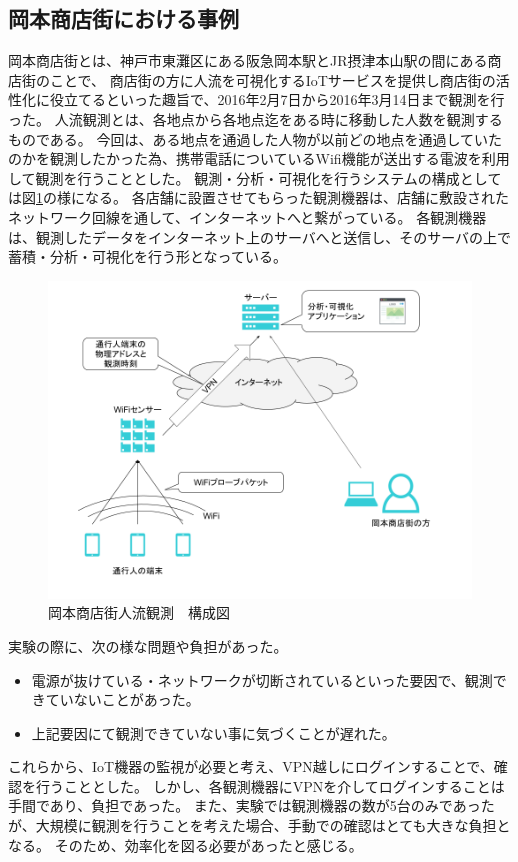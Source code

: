 \subsection{岡本商店街における事例}
岡本商店街とは、神戸市東灘区にある阪急岡本駅とJR摂津本山駅の間にある商店街のことで、
商店街の方に人流を可視化するIoTサービスを提供し商店街の活性化に役立てるといった趣旨で、2016年2月7日から2016年3月14日まで観測を行った。
人流観測とは、各地点から各地点迄をある時に移動した人数を観測するものである。
今回は、ある地点を通過した人物が以前どの地点を通過していたのかを観測したかった為、携帯電話についているWifi機能が送出する電波を利用して観測を行うこととした。
観測・分析・可視化を行うシステムの構成としては図\ref{fig:okamoto_diag1}の様になる。
各店舗に設置させてもらった観測機器は、店舗に敷設されたネットワーク回線を通して、インターネットへと繋がっている。
各観測機器は、観測したデータをインターネット上のサーバへと送信し、そのサーバの上で蓄積・分析・可視化を行う形となっている。
\medskip

\begin{figure}[htb]
\includegraphics[width=16cm]{images/okamoto_diag1.png}
\caption{岡本商店街人流観測　構成図}
\label{fig:okamoto_diag1}
\end{figure}

実験の際に、次の様な問題や負担があった。
\begin{itemize}
\item 電源が抜けている・ネットワークが切断されているといった要因で、観測できていないことがあった。
\item 上記要因にて観測できていない事に気づくことが遅れた。
\end{itemize}
これらから、IoT機器の監視が必要と考え、VPN越しにログインすることで、確認を行うこととした。
しかし、各観測機器にVPNを介してログインすることは手間であり、負担であった。
また、実験では観測機器の数が5台のみであったが、大規模に観測を行うことを考えた場合、手動での確認はとても大きな負担となる。
そのため、効率化を図る必要があったと感じる。

